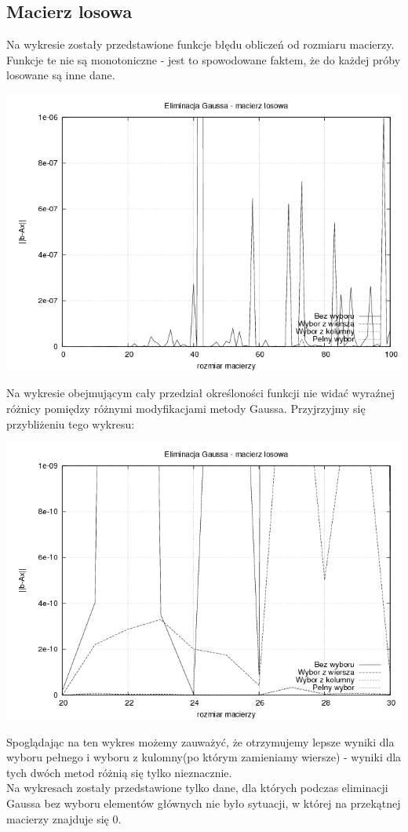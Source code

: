 \documentclass[a4paper,10pt]{article}
\begin{document}
    \subsection{Macierz losowa}
        Na wykresie zostały przedstawione funkcje błędu obliczeń od rozmiaru macierzy. Funkcje te nie są monotoniczne - jest to spowodowane faktem, że do każdej próby losowane są inne dane.
        \begin{center}
            \includegraphics[width=140mm]{random_plot.png}
        \end{center}
        Na wykresie obejmującym cały przedział określoności funkcji nie widać wyraźnej różnicy pomiędzy różnymi modyfikacjami metody Gaussa. Przyjrzyjmy się przybliżeniu tego wykresu:
        \begin{center}
            \includegraphics[width=140mm]{random_focus_plot.png}
        \end{center}
        Spoglądając na ten wykres możemy zauważyć, że otrzymujemy lepsze wyniki dla wyboru pełnego i wyboru z kulomny(po którym zamieniamy wiersze) - wyniki dla tych dwóch metod różnią się tylko nieznacznie.\\
    Na wykresach zostały przedstawione tylko dane, dla których podczas eliminacji Gaussa bez wyboru elementów głównych nie było sytuacji, w której na przekątnej macierzy znajduje się $0$.
\end{document}

